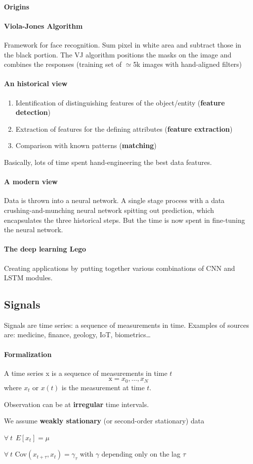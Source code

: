 \documentclass[10pt]{report}
\begin{document}
\paragraph{Origins} 
\paragraph{Viola-Jones Algorithm} Framework for face recognition. Sum pixel in white area and subtract those in the black portion. The VJ algorithm positions the masks on the image and combines the responses (training set of $\simeq$5k images with hand-aligned filters)
\paragraph{An historical view} \begin{enumerate}
	\item Identification of distinguishing features of the object/entity (\textbf{feature detection})
	\item Extraction of features for the defining attributes (\textbf{feature extraction})
	\item Comparison with known patterns (\textbf{matching})
\end{enumerate}
Basically, lots of time spent hand-engineering the best data features.
\paragraph{A modern view}
Data is thrown into a neural network. A single stage process with a data crushing-and-munching neural network spitting out prediction, which encapsulates the three historical steps. But the time is now spent in fine-tuning the neural network.
\paragraph{The deep learning Lego} Creating applications by putting together various combinations of CNN and LSTM modules.
\subsection{Signals}
Signals are time series: a sequence of measurements in time. Examples of sources are: medicine, finance, geology, IoT, biometrics\ldots
\paragraph{Formalization} A time series x is a sequence of measurements in time $t$
$$\text{x} = x_0,\ldots,x_N$$
where $x_t$ or $x(t)$ is the measurement at time $t$.
\begin{list}{}{}
	\item Observation can be at \textbf{irregular} time intervals.
	\item We assume \textbf{weakly stationary} (or second-order stationary) data\begin{list}{}{}
		\item $\forall\:t\:\:E[x_t] = \mu$
		\item $\forall\:t$ Cov$(x_{t+\tau},x_t) = \gamma_\tau$ with $\gamma$ depending only on the lag $\tau$
	\end{list}
\end{list}
\end{document}
